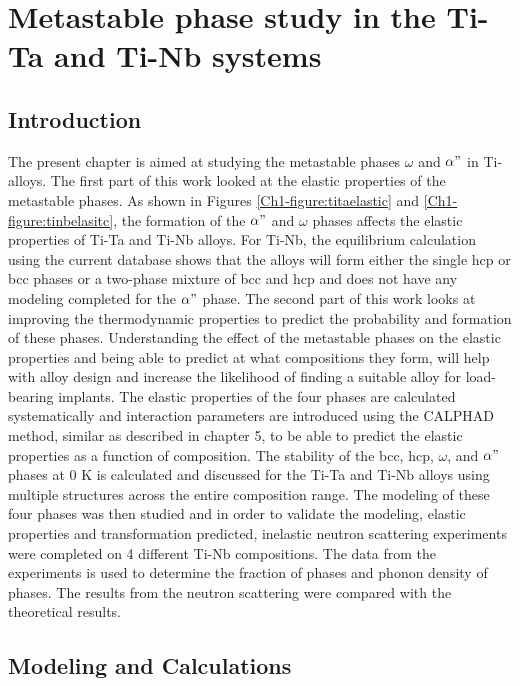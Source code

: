 \chapter{Metastable phase study in the Ti-Ta and Ti-Nb systems}

\section{Introduction}

The present chapter is aimed at studying the metastable phases $\omega$ and $\alpha"$ in Ti-alloys. The first part of this work looked at the elastic properties of the metastable phases. As shown in Figures \ref{Ch1-figure:titaelastic} and \ref{Ch1-figure:tinbelasitc}, the formation of the $\alpha"$ and $\omega$ phases affects the elastic properties of Ti-Ta and Ti-Nb alloys. For Ti-Nb, the equilibrium calculation using the current database shows that the alloys will form either the single hcp or bcc phases or a two-phase mixture of bcc and hcp and does not have any modeling completed for the $\alpha"$ phase. The second part of this work looks at improving the thermodynamic properties to predict the probability and formation of these phases. Understanding the effect of the metastable phases on the elastic properties and being able to predict at what compositions they form, will help with alloy design and increase the likelihood of finding a suitable alloy for load-bearing implants. The elastic properties of the four phases are calculated systematically and interaction parameters are introduced using the CALPHAD method, similar as described in chapter 5, to be able to predict the elastic properties as a function of composition. The stability of the bcc, hcp, $\omega$, and $\alpha"$ phases at 0 K is calculated and discussed for the Ti-Ta and Ti-Nb alloys using multiple structures across the entire composition range. The modeling of these four phases was then studied and in order to validate the modeling, elastic properties and transformation predicted, inelastic neutron scattering experiments were completed on 4 different Ti-Nb compositions. The data from the experiments is used to determine the fraction of phases and phonon density of phases. The results from the neutron scattering were compared with the theoretical results. 

\section{Modeling and Calculations}

